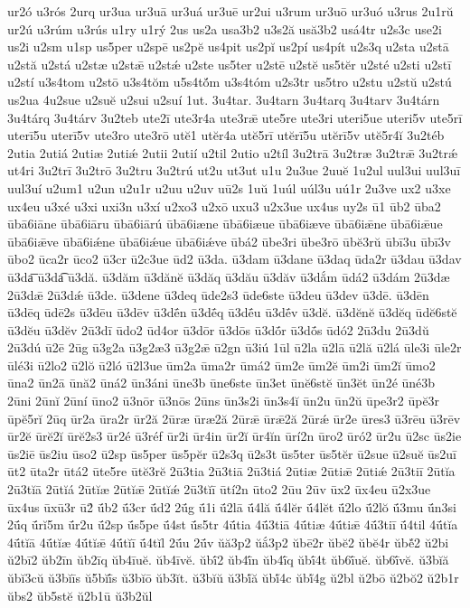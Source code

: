 {ur2ó
u3rós
2urq
ur3ua
ur3uā
ur3uá
ur3uē
ur2ui
u3rum
ur3uō
ur3uó
u3rus
2u1rŭ
ur2ú
u3rúm
u3rús
u1ry
u1rý
2us
us2a
usa3b2
u3s2ă
usă3b2
usá4tr
u2s3c
use2i
us2i
u2sm
u1sp
us5per
u2spē
us2pĕ
us4pit
us2pĭ
us2pí
us4pít
u2s3q
u2sta
u2stā
u2stă
u2stá
u2stæ
u2stǣ
u2stǽ
u2ste
us5ter
u2stē
u2stĕ
us5tĕr
u2sté
u2sti
u2stī
u2stí
u3s4tom
u2stō
u3s4tŏm
u5s4tŏ́m
u3s4tóm
u2s3tr
us5tro
u2stu
u2stŭ
u2stú
us2ua
4u2sue
u2suĕ
u2sui
u2suí
1ut.
3u4tar.
3u4tarn
3u4tarq
3u4tarv
3u4tárn
3u4tárq
3u4tárv
3u2teb
ute2ī
ute3r4a
ute3rǣ
ute5re
ute3ri
uteri5ue
uteri5v
ute5rī
uterī5u
uterī5v
ute3ro
ute3rō
utĕ1
utĕr4a
utĕ5rī
utĕrī5u
utĕrī5v
utĕ5r4ĭ
3u2téb
2utia
2utiá
2utiæ
2utiǽ
2utii
2utií
u2til
2utio
u2tíl
3u2trā
3u2træ
3u2trǣ
3u2trǽ
ut4ri
3u2trī
3u2trō
3u2tru
3u2trú
ut2u
ut3ut
u1u
2u3ue
2uuĕ
1u2ul
uul3ui
uul3uī
uul3uí
u2um1
u2un
u2u1r
u2uu
u2uv
uū2s
1uŭ
1uúl
uúl3u
uú1r
2u3ve
ux2
u3xe
ux4eu
u3xé
u3xi
uxi3n
u3xí
u2xo3
u2xō
uxu3
u2x3ue
ux4us
uy2s
ū1
ūb2
ūba2
ūbā6iāne
ūbā6iāru
ūbā6iārú
ūbā6iæne
ūbā6iæue
ūbā6iæve
ūbā6iǣne
ūbā6iǣue
ūbā6iǣve
ūbā6iǽne
ūbā6iǽue
ūbā6iǽve
ūbá2
ūbe3ri
ūbe3rō
ūbĕ3rŭ
ūbī3u
ūbī3v
ūbo2
ūca2r
ūco2
ū3cr
ū2c3ue
ūd2
ū3da.
ū3dam
ū3dane
ū3daq
ūda2r
ū3dau
ū3dav
ū3da͞
ū3da͡
ū3dă.
ū3dăm
ū3dănĕ
ū3dăq
ū3dău
ū3dăv
ū3dắm
ūdá2
ū3dám
2ū3dæ
2ū3dǣ
2ū3dǽ
ū3de.
ū3dene
ū3deq
ūde2s3
ūde6ste
ū3deu
ū3dev
ū3dē.
ū3dēn
ū3dēq
ūdē2s
ū3dēu
ū3dēv
ū3dḗn
ū3dḗq
ū3dḗu
ū3dḗv
ū3dĕ.
ū3dĕnĕ
ū3dĕq
ūdĕ6stĕ
ū3dĕu
ū3dĕv
2ū3dī
ūdo2
ūd4or
ū3dōr
ū3dōs
ū3dṓr
ū3dṓs
ūdó2
2ū3du
2ū3dŭ
2ū3dú
ū2ē
2ūg
ū3g2a
ū3g2æ3
ū3g2ǣ
ū2gn
ū3iú
1ūl
ū2la
ū2lā
ū2lă
ū2lá
ūle3i
ūle2r
ūlé3i
ū2lo2
ū2lŏ
ū2ló
ū2l3ue
ūm2a
ūma2r
ūmá2
ūm2e
ūm2ĕ
ūm2i
ūm2ĭ
ūmo2
ūna2
ūn2ā
ūnă2
ūná2
ūn3áni
ūne3b
ūne6ste
ūn3et
ūnĕ6stĕ
ūn3ĕt
ūn2é
ūné3b
2ūni
2ūnĭ
2ūní
ūno2
ū3nōr
ū3nōs
2ūns
ūn3s2i
ūn3s4ĭ
ūn2u
ūn2ŭ
ūpe3r2
ūpĕ3r
ūpĕ5rĭ
2ūq
ūr2a
ūra2r
ūr2ă
2ūræ
ūræ2ă
2ūrǣ
ūrǣ2ă
2ūrǽ
ūr2e
ūres3
ū3rēu
ū3rēv
ūr2ĕ
ūrĕ2ĭ
ūrĕ2s3
ūr2é
ū3réf
ūr2i
ūr4in
ūr2ĭ
ūr4ĭn
ūrí2n
ūro2
ūró2
ūr2u
ū2sc
ūs2ie
ūs2iē
ūs2iu
ūso2
ū2sp
ūs5per
ūs5pĕr
ū2s3q
ū2s3t
ūs5ter
ūs5tĕr
ū2sue
ū2suĕ
ūs2uī
ūt2
ūta2r
ūtá2
ūte5re
ūtĕ3rĕ
2ū3tia
2ū3tiā
2ū3tiá
2ūtiæ
2ūtiǣ
2ūtiǽ
2ū3tiī
2ūtĭa
2ū3tĭā
2ūtĭá
2ūtĭæ
2ūtĭǣ
2ūtĭǽ
2ū3tĭī
ūtí2n
ūto2
2ūu
2ūv
ūx2
ūx4eu
ū2x3ue
ūx4us
ūxū3r
ū2́
ū́b2
ū́3cr
ū́d2
2ū́g
ū́1i
ū́2lā
ū́4lă
ū́4lĕr
ū́4lĕt
ū́2lo
ū́2lŏ
ū́3mu
ū́n3si
2ū́q
ū́rĭ5m
ū́r2u
ū́2sp
ū́s5pe
ū́4st
ū́s5tr
4ū́tia
4ū́3tiā
4ū́tiæ
4ū́tiǣ
4ū́3tiī
ū́4til
4ū́tĭa
4ū́tĭā
4ū́tĭæ
4ū́tĭǣ
4ū́tĭī
ū́4tĭl
2ū́u
2ū́v
ŭă3p2
ŭắ3p2
ŭbē2r
ŭbĕ2
ŭbĕ4r
ŭbĕ́2
ŭ2bi
ŭ2bī2
ŭb2īn
ŭb2īq
ŭb4īuĕ.
ŭb4īvĕ.
ŭbī́2
ŭb4ī́n
ŭb4ī́q
ŭbī́4t
ŭb6ī́uĕ.
ŭb6ī́vĕ.
ŭ3bĭă
ŭbĭ3cŭ
ŭ3bĭīs
ŭ5bĭī́s
ŭ3bĭō
ŭb3ĭt.
ŭ3bĭŭ
ŭ3bĭ́ă
ŭbĭ́4c
ŭbĭ́4g
ŭ2bl
ŭ2bō
ŭ2bŏ2
ŭ2b1r
ŭbs2
ŭb5stĕ
ŭ2b1ū
ŭ3b2ŭl
}
